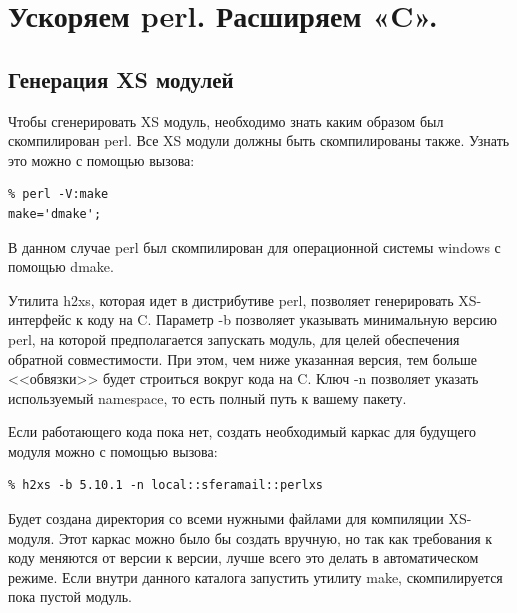 \setcounter{chapter}{9}
\chapter{Ускоряем perl. Расширяем «C».}
\section{Генерация XS модулей}
Чтобы сгенерировать XS модуль, необходимо знать каким образом был скомпилирован perl. Все XS модули должны быть скомпилированы также. Узнать это можно с помощью вызова:
\begin{verbatim}
% perl -V:make
make='dmake';
\end{verbatim}
В данном случае perl был скомпилирован для операционной системы windows с помощью dmake.

Утилита h2xs, которая идет в дистрибутиве perl, позволяет генерировать XS-интерфейс к коду на C. Параметр -b позволяет указывать минимальную версию perl, на которой предполагается запускать модуль, для целей обеспечения обратной совместимости. При этом, чем ниже указанная версия, тем больше <<обвязки>> будет строиться вокруг кода на C. Ключ -n позволяет указать используемый namespace, то есть полный путь к вашему пакету.

Если работающего кода пока нет, создать необходимый каркас для будущего модуля можно с помощью вызова:
\begin{verbatim}
% h2xs -b 5.10.1 -n local::sferamail::perlxs
\end{verbatim}
Будет создана директория со всеми нужными файлами для компиляции XS-модуля. Этот каркас можно было бы создать вручную, но так как требования к коду меняются от версии к версии, лучше всего это делать в автоматическом режиме. Если внутри данного каталога запустить утилиту make, скомпилируется пока пустой модуль.

